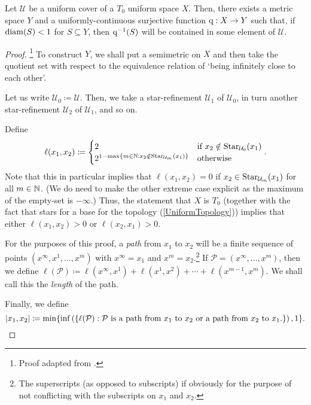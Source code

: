 \begin{thm}
\begin{savenotes}
Let $\mathcal{U}$ be a uniform cover of a $T_0$ uniform space $X$.  Then, there exists a metric space $Y$ and a uniformly-continuous surjective function $\mathrm{q} :X\rightarrow Y$ such that, if $\operatorname{diam} (S)<1$ for $S\subseteq Y$, then $\mathrm{q} ^{-1}(S)$ will be contained in some element of $\mathcal{U}$.
\begin{proof}\footnote{Proof adapted from \cite[pg.~8]{Isbell}.}
To construct $Y$, we shall put a semimetric on $X$ and then take the quotient set with respect to the equivalence relation of `being infinitely close to each other'.

Let us write $\mathcal{U}_0\coloneqq \mathcal{U}$.  Then, we take a star-refinement $\mathcal{U}_1$ of $\mathcal{U}_0$, in turn another star-refinement $\mathcal{U}_2$ of $\mathcal{U}_1$, and so on.

\label{stp4.8.76.2}
Define
\begin{equation}
\ell (x_1,x_2)\coloneqq \begin{cases}2 & \text{if }x_2\notin \operatorname{Star} _{\mathcal{U}_0}(x_1) \\ 2^{1-\max \{ m\in \mathbb{N} :x_2\notin \operatorname{Star} _{\mathcal{U}_m}(x_1)\}} & \text{otherwise}\end{cases}.
\end{equation}
Note that this in particular implies that $\ell (x_1,x_2)=0$ if $x_2\in \operatorname{Star} _{\mathcal{U}_m}(x_1)$ for all $m\in \mathbb{N}$.  (We do need to make the other extreme case explicit as the maximum of the empty-set is $-\infty$.)  Thus, the statement that $X$ is $T_0$ (together with the fact that stars for a base for the topology (\cref{UniformTopology})) implies that either $\ell (x_1,x_2)>0$ or $\ell (x_2,x_1)>0$.

For the purposes of this proof, a \emph{path} from $x_1$ to $x_2$ will be a finite sequence of points $(x^\infty,x^1,\ldots ,x^m)$ with $x^\infty=x_1$ and $x^m=x_2$.\footnote{The superscripts (as opposed to subscripts) if obviously for the purpose of not conflicting with the subscripts on $x_1$ and $x_2$.}  If $\mathcal{P}=(x^\infty,\ldots ,x^m)$, then we define $\ell (\mathcal{P})\coloneqq \ell (x^\infty,x^1)+\ell (x^1,x^2)+\cdots +\ell (x^{m-1},x^m)$.   We shall call this the \emph{length} of the path.

Finally, we define
\begin{equation}
\metric[x_1][x_2]\coloneqq \min \{ \inf \left( \left\{ \ell (\mathcal{P}):\mathcal{P}\text{ is a path from }x_1\text{ to }x_2\text{ or a path from }x_2\text{ to }x_1\text{.}\right\} \right) ,1\} .
\end{equation}


\end{proof}
\end{savenotes}
\end{thm}
